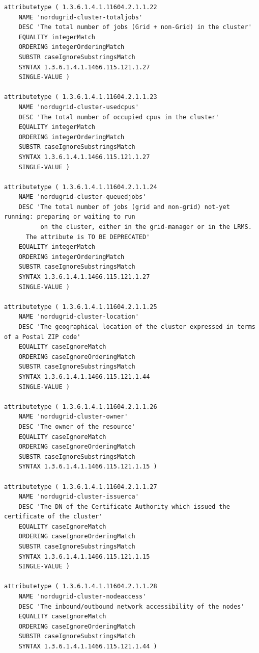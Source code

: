 \documentclass{article}
\begin{document}
\begin{verbatim}
attributetype ( 1.3.6.1.4.1.11604.2.1.1.22
    NAME 'nordugrid-cluster-totaljobs'
    DESC 'The total number of jobs (Grid + non-Grid) in the cluster'
    EQUALITY integerMatch
    ORDERING integerOrderingMatch
    SUBSTR caseIgnoreSubstringsMatch
    SYNTAX 1.3.6.1.4.1.1466.115.121.1.27
    SINGLE-VALUE ) 
       
attributetype ( 1.3.6.1.4.1.11604.2.1.1.23
    NAME 'nordugrid-cluster-usedcpus'
    DESC 'The total number of occupied cpus in the cluster'
    EQUALITY integerMatch
    ORDERING integerOrderingMatch
    SUBSTR caseIgnoreSubstringsMatch
    SYNTAX 1.3.6.1.4.1.1466.115.121.1.27
    SINGLE-VALUE )  
    
attributetype ( 1.3.6.1.4.1.11604.2.1.1.24
    NAME 'nordugrid-cluster-queuedjobs'
    DESC 'The total number of jobs (grid and non-grid) not-yet running: preparing or waiting to run 
          on the cluster, either in the grid-manager or in the LRMS. 
	  The attribute is TO BE DEPRECATED'
    EQUALITY integerMatch
    ORDERING integerOrderingMatch
    SUBSTR caseIgnoreSubstringsMatch
    SYNTAX 1.3.6.1.4.1.1466.115.121.1.27
    SINGLE-VALUE )   

attributetype ( 1.3.6.1.4.1.11604.2.1.1.25
    NAME 'nordugrid-cluster-location'
    DESC 'The geographical location of the cluster expressed in terms of a Postal ZIP code'
    EQUALITY caseIgnoreMatch
    ORDERING caseIgnoreOrderingMatch
    SUBSTR caseIgnoreSubstringsMatch
    SYNTAX 1.3.6.1.4.1.1466.115.121.1.44 
    SINGLE-VALUE )
    
attributetype ( 1.3.6.1.4.1.11604.2.1.1.26
    NAME 'nordugrid-cluster-owner'
    DESC 'The owner of the resource'
    EQUALITY caseIgnoreMatch
    ORDERING caseIgnoreOrderingMatch
    SUBSTR caseIgnoreSubstringsMatch
    SYNTAX 1.3.6.1.4.1.1466.115.121.1.15 ) 
        
attributetype ( 1.3.6.1.4.1.11604.2.1.1.27
    NAME 'nordugrid-cluster-issuerca'
    DESC 'The DN of the Certificate Authority which issued the certificate of the cluster'
    EQUALITY caseIgnoreMatch
    ORDERING caseIgnoreOrderingMatch
    SUBSTR caseIgnoreSubstringsMatch
    SYNTAX 1.3.6.1.4.1.1466.115.121.1.15 
    SINGLE-VALUE ) 

attributetype ( 1.3.6.1.4.1.11604.2.1.1.28
    NAME 'nordugrid-cluster-nodeaccess'
    DESC 'The inbound/outbound network accessibility of the nodes'
    EQUALITY caseIgnoreMatch
    ORDERING caseIgnoreOrderingMatch
    SUBSTR caseIgnoreSubstringsMatch
    SYNTAX 1.3.6.1.4.1.1466.115.121.1.44 )
    

\end{verbatim}
\end{document}

